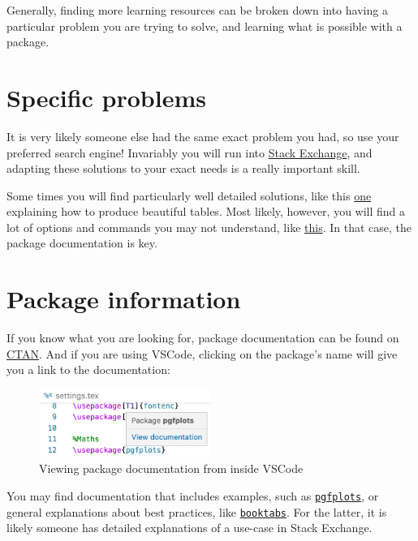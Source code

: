 Generally, finding more learning resources can be broken down into having a particular problem you are trying to solve, and learning what is possible with a package.
\section{Specific problems}
It is very likely someone else had the same exact problem you had, so use your preferred search engine!
Invariably you will run into \href{https://tex.stackexchange.com/}{Stack Exchange}, and adapting these solutions to your exact needs is a really important skill.

Some times you will find particularly well detailed solutions, like this \href{https://tex.stackexchange.com/questions/604496/how-to-generate-beautiful-tables-in-latex}{one} explaining how to produce beautiful tables.
Most likely, however, you will find a lot of options and commands you may not understand, like \href{https://tex.stackexchange.com/questions/603781/how-can-i-draw-the-following-graph-with-tikz}{this}.
In that case, the package documentation is key.
\section{Package information}
If you know what you are looking for, package documentation can be found on \href{https://www.ctan.org/pkg/}{CTAN}.
And if you are using VSCode, clicking on the package's name will give you a link to the documentation:
\begin{figure}[h]
\centering
    \includegraphics[width=0.5\textwidth]{figures/package-info.png}
\caption{Viewing package documentation from inside VSCode}
\end{figure}

You may find documentation that includes examples, such as \href{https://anorien.csc.warwick.ac.uk/mirrors/CTAN/graphics/pgf/contrib/pgfplots/doc/pgfplots.pdf}{\texttt{pgfplots}}, or general explanations about best practices, like \href{https://mirror.ox.ac.uk/sites/ctan.org/macros/latex/contrib/booktabs/booktabs.pdf}{\texttt{booktabs}}.
For the latter, it is likely someone has detailed explanations of a use-case in Stack Exchange.